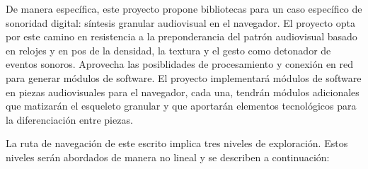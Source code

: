 De manera específica, este proyecto propone bibliotecas para un caso específico de sonoridad digital: síntesis granular audiovisual en el navegador. El proyecto opta por este camino en resistencia a la preponderancia del patrón audiovisual basado en relojes y en pos de la densidad, la textura y el gesto como detonador de eventos sonoros. Aprovecha las posiblidades de procesamiento y conexión en red para generar módulos de software. El proyecto implementará módulos de software en piezas audiovisuales para el navegador, cada una, tendrán módulos adicionales que matizarán el esqueleto granular y que aportarán elementos tecnológicos para la diferenciación entre piezas.

La ruta de navegación de este escrito implica tres niveles de exploración. Estos niveles serán abordados de manera no lineal y se describen a continuación:  

